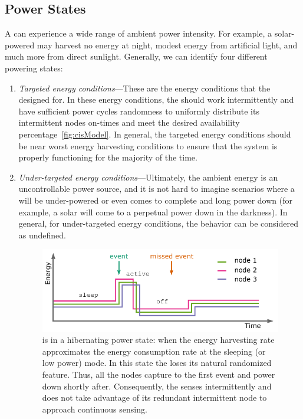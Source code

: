 \subsection{Power States}
\label{sec:power_state}
A \sys can experience a wide range of ambient power intensity. For example, a solar-powered \sys may harvest no energy at night, modest energy from artificial light, and much more from direct sunlight.  Generally, we can identify four different \sys powering states: 
\begin{enumerate}
		\item \textit{Targeted energy conditions}---These are the energy conditions that the \sys designed for. In these energy conditions, the \sys should work intermittently and have sufficient power cycles randomness to uniformly distribute its intermittent nodes on-times and meet the desired availability percentage~\ref{fig:cisModel}. In general, the targeted energy conditions should be near worst energy harvesting conditions to ensure that the system is properly functioning for the majority of the time.
		\item \textit{Under-targeted energy conditions}---Ultimately, the ambient energy is an uncontrollable power source, and it is not hard to imagine scenarios where a \sys will be under-powered or even comes to complete and long power down (for example, a solar \sys will come to a perpetual power down in the darkness). In general, for under-targeted energy conditions, the \sys behavior can be considered as undefined.
%
\begin{figure}
		\centering
		\includegraphics[width=\columnwidth]{figures/hibernating_power_state}
		\caption{\fullsys is in a hibernating power state: when the energy harvesting rate approximates the energy consumption rate at the sleeping (or low power) mode. In this state the \sys loses its natural randomized feature. Thus, all the nodes capture to the first event and power down shortly after. Consequently, the \sys senses intermittently and does not take advantage of its redundant intermittent node to approach continuous sensing.}

\end{figure}
\end{enumerate}
